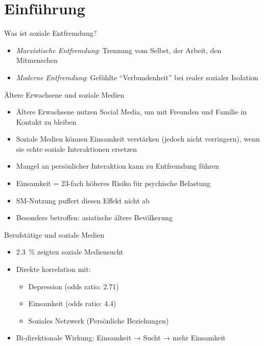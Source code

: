 
\section{Einführung}\label{sec:einfuhrung}
\begin{frame}{Was ist soziale Entfremdung?~\cite{rey_alienation_2012}}
    \begin{itemize}
        \item \textit{Marxistische Entfremdung}: Trennung vom Selbst, der Arbeit, den Mitmenschen
        \item \textit{Moderne Entfremdung}: Gefühlte \enquote{Verbundenheit} bei realer sozialer Isolation
    \end{itemize}
\end{frame}
\begin{frame}{Ältere Erwachsene und soziale Medien~\cite{siddiq_social_2024}}
    \begin{itemize}
        \item Ältere Erwachsene nutzen Social Media, um mit Freunden und Familie in Kontakt zu bleiben
        \item Soziale Medien können Einsamkeit verstärken (jedoch nicht verringern), wenn sie echte soziale Interaktionen ersetzen
        \item \alert<2>{Mangel an persönlicher Interaktion} kann zu Entfremdung führen
        \item Einsamkeit = 23-fach höheres Risiko für psychische Belastung
        \item \alert<2>{SM-Nutzung puffert diesen Effekt nicht ab}
        \item Besonders betroffen: asiatische ältere Bevölkerung
    \end{itemize}
\end{frame}
\begin{frame}{Berufstätige und soziale Medien~\cite{santini_social_2024}}
    \begin{itemize}
        \item \SI{2,3}{\percent} zeigten soziale Mediensucht
        \item Direkte korrelation mit:
        \begin{itemize}
            \item Depression (odds ratio: 2.71)
            \item Einsamkeit (odds ratio: 4.4)
            \item Soziales Netzwerk (Persönliche Beziehungen)
        \end{itemize}
        \item Bi-direktionale Wirkung: Einsamkeit → Sucht → mehr Einsamkeit
    \end{itemize}
\end{frame}
